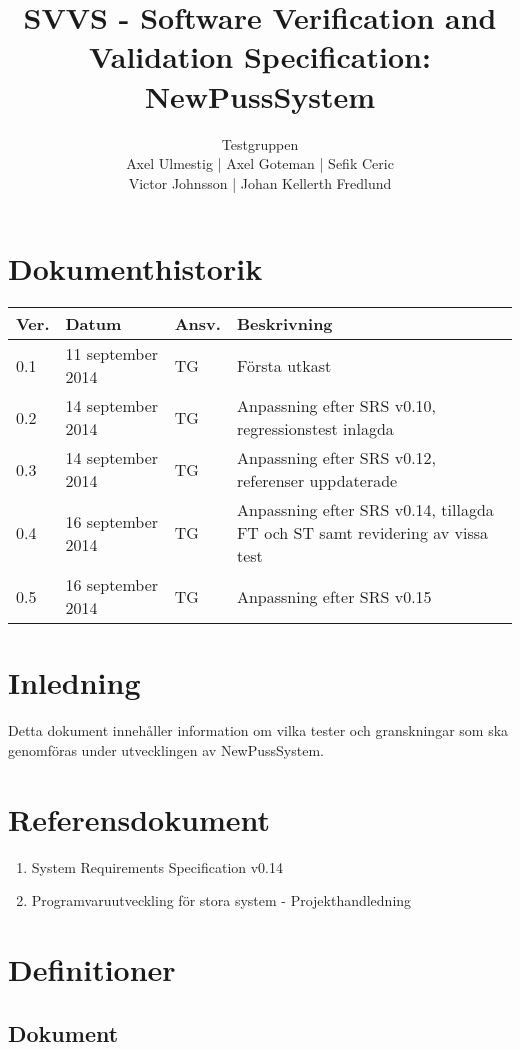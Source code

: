 \documentclass[a4paper]{article}
\title{SVVS - Software Verification and Validation Specification: NewPussSystem}
\author{Testgruppen \\ Axel Ulmestig | Axel Goteman | Sefik Ceric \\ Victor Johnsson | Johan Kellerth Fredlund}
\date{}
\begin{document}
\maketitle
\thispagestyle{fancy}
\tableofcontents
\newpage

\section*{Dokumenthistorik}

\begin{tabular}{ l l l l }
Ver. & Datum & Ansv. & Beskrivning \\\hline
0.1 & 11 september 2014 & TG & Första utkast \\
0.2 & 14 september 2014 & TG & Anpassning efter SRS v0.10, regressionstest inlagda \\
0.3 & 14 september 2014 & TG & Anpassning efter SRS v0.12, referenser uppdaterade\\
0.4 & 16 september 2014 & TG & Anpassning efter SRS v0.14, tillagda FT och ST samt revidering av vissa test\\
0.5 & 16 september 2014 & TG & Anpassning efter SRS v0.15\\


\end{tabular}
\section{Inledning}       

Detta dokument innehåller information om vilka tester och granskningar som ska genomföras under utvecklingen av NewPussSystem.

\section{Referensdokument}
\begin{enumerate}
\item System Requirements Specification v0.14
\item Programvaruutveckling för stora system - Projekthandledning
\end{enumerate}

\section{Definitioner}

\subsection{Dokument}
\end{document}

